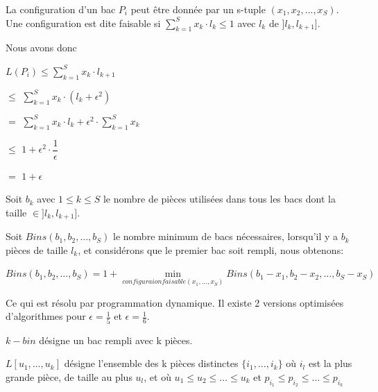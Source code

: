 \documentclass[a4paper,12pt]{report}
\theoremstyle{plain}				%
\theoremstyle{definition}				%
\begin{document}
La configuration d'un bac $P_i$ peut être donnée par un s-tuple $(x_1, x_2, \ldots, x_S)$.
Une configuration est dite faisable si $\sum_{k=1}^{S}x_k \cdot l_k \le 1$ avec $l_k$ de $]l_k, l_{k+1}]$.

Nous avons donc

$L(P_i) \le \sum_{k=1}^{S}x_k \cdot l_{k+1}$

$\le$
$\sum_{k=1}^{S}x_k \cdot (l_k+\epsilon^2)$

$=$
$\sum_{k=1}^{S}x_k \cdot l_k  +  \epsilon^2 \cdot \sum_{k=1}^{S}x_k$

$\le$
$1 + \epsilon^2 \cdot \dfrac{1}{\epsilon}$

$=$
$1 + \epsilon$

\bigskip
Soit $b_k$ avec $1 \le k \le S$ le nombre de pièces utilisées dans tous les bacs dont la taille $\in ]l_k, l_{k+1}]$.

Soit $Bins(b_1, b_2, \ldots, b_S)$ le nombre minimum de bacs
nécessaires, lorsqu'il y a $b_k$ pièces de taille $l_k$, et
considérons que le premier bac soit rempli, nous obtenons:

$Bins(b_1, b_2, \ldots, b_S) = 1 + \underset{configuraion faisable (x_1, \ldots, x_S)}{\min} Bins(b_1-x_1, b_2-x_2, \ldots, b_S-x_S)$

Ce qui est résolu par programmation dynamique.
Il existe 2 versions optimisées d'algorithmes pour
$\epsilon = \frac{1}{5}$ et
$\epsilon = \frac{1}{6}$.

\bigskip

$k-bin$ désigne un bac rempli avec k pièces.

$L[u_1, \ldots, u_k]$ désigne l'ensemble des
k pièces distinctes $\{i_1, \ldots, i_k\}$
où $i_l$ est la plus grande pièce, de taille au plus $u_l$,
et où $u_1 \leq u_2 \leq \ldots \leq u_k$ et
$p_{i_1} \leq p_{i_2} \leq \ldots \leq p_{i_k}$
\end{document}
